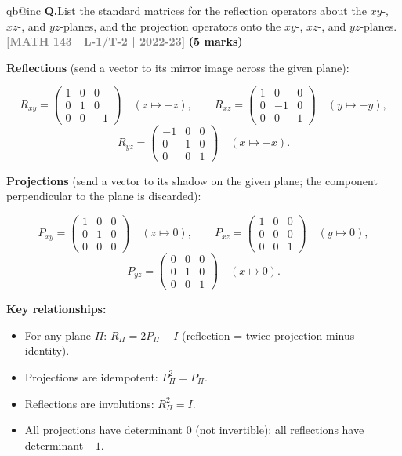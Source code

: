 \documentclass[12pt,a3paper]{article}
\makeatletter
\newcommand{\yr}[1]{\hfill\textcolor{gray}{\small\textbf{[#1]}}}
\newcommand{\mk}[1]{\textcolor{orange!70!black}{\small\textbf{(#1 marks)}}}
\newcounter{qnum}
\newcommand{\Q}[1]{%
  \csname qb@inc\endcsname
  \needspace{4\baselineskip}
  \refstepcounter{qnum}
  \vspace{6pt}
  \noindent\textbf{Q\theqnum.}\enspace #1\par
}
\makeatother
\begin{document}
\Q{List the standard matrices for the reflection operators about the $xy$-, $xz$-, and $yz$-planes, and the projection operators onto the $xy$-, $xz$-, and $yz$-planes.
\yr{MATH 143 | L-1/T-2 | 2022-23} \mk{5}}


\begin{tcolorbox}[enhanced,breakable,
  colback=cF!4,colframe=cF,boxrule=0.8pt,arc=5pt,
  title={\textbf{Answer --- Standard Matrices: Reflections \& Projections in $\mathbb{R}^3$}},
  fonttitle=\bfseries\color{white},colbacktitle=cF]

\textbf{Reflections} (send a vector to its mirror image across the given plane):

\[
R_{xy}=\begin{pmatrix}1&0&0\\0&1&0\\0&0&-1\end{pmatrix}\quad(z\mapsto-z),
\qquad
R_{xz}=\begin{pmatrix}1&0&0\\0&-1&0\\0&0&1\end{pmatrix}\quad(y\mapsto-y),
\]
\[
R_{yz}=\begin{pmatrix}-1&0&0\\0&1&0\\0&0&1\end{pmatrix}\quad(x\mapsto-x).
\]

\textbf{Projections} (send a vector to its shadow on the given plane; the component perpendicular to the plane is discarded):

\[
P_{xy}=\begin{pmatrix}1&0&0\\0&1&0\\0&0&0\end{pmatrix}\quad(z\mapsto0),
\qquad
P_{xz}=\begin{pmatrix}1&0&0\\0&0&0\\0&0&1\end{pmatrix}\quad(y\mapsto0),
\]
\[
P_{yz}=\begin{pmatrix}0&0&0\\0&1&0\\0&0&1\end{pmatrix}\quad(x\mapsto0).
\]

\textbf{Key relationships:}
\begin{itemize}[itemsep=2pt]
  \item For any plane $\Pi$: $R_\Pi = 2P_\Pi - I$ (reflection = twice projection minus identity).
  \item Projections are idempotent: $P_\Pi^2=P_\Pi$.
  \item Reflections are involutions: $R_\Pi^2=I$.
  \item All projections have determinant 0 (not invertible); all reflections have determinant $-1$.
\end{itemize}

\end{tcolorbox}
\end{document}
